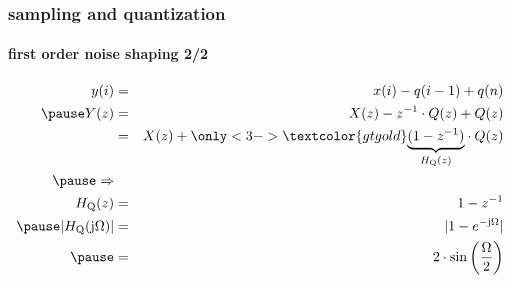 	\begin{frame}\frametitle{sampling and quantization}\framesubtitle{first order noise shaping 2/2}
		\begin{eqnarray}
			y(i) &=& x(i)-q(i-1)+q(n)\nonumber\\
			\pause
			Y(z) &=& X(z) - z^{-1}\cdot Q(z) + Q(z)\nonumber\\
			&=& X(z) + \only<3->{\textcolor{gtgold}}{\underbrace{(1-z^{-1})}_{H_\mathrm{Q}(z)}}\cdot Q(z)\\
			\pause
			\Rightarrow&&\nonumber\\
			H_\mathrm{Q}(z) &=& 1-z^{-1}\\
			\pause
            \bigskip
			|H_\mathrm{Q}(\jOm)| &=& |1-e^{-\jOm}|\\
			\pause
            \bigskip
			&=& 2\cdot \sin\left(\frac{\Omega}{2}\right) 
		\end{eqnarray}
	
	\end{frame}
	
